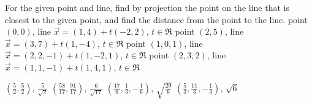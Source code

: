 
\begin{Exercise}[
name={},
title={}, 
difficulty=0,
origin={\cite{SM}}]
For the given point and line, find by projection the point on the line that is closest to the given point, and find the distance from the point to the line.
\Question point $(0,0)$, line $\vec{x}=(1,4)+t(-2,2)$, $t\in\Re$
\Question point $(2,5)$, line $\vec{x}=(3,7)+t(1,-4)$, $t\in\Re$
\Question point $(1,0,1)$, line $\vec{x}=(2,2,-1)+t(1,-2,1)$, $t\in\Re$
\Question point $(2,3,2)$, line $\vec{x}=(1,1,-1)+t(1,4,1)$, $t\in\Re$
\end{Exercise}

\begin{Answer}
\Question $\left(\frac{5}{2},\frac{5}{2}\right)$, $\frac{5}{\sqrt{2}}$
\Question $\left(\frac{58}{17},\frac{91}{17}\right)$, $\frac{6}{\sqrt{17}}$
\Question $\left(\frac{17}{6},\frac{1}{3},-\frac{1}{6}\right)$, $\sqrt{\frac{29}{6}}$
\Question $\left(\frac{5}{3},\frac{11}{3},-\frac{1}{3}\right)$, $\sqrt{6}$
\end{Answer}
